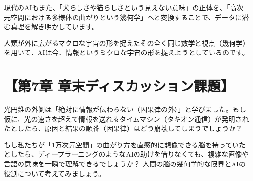 現代のAIもまた、「犬らしさや猫らしさという見えない意味」の正体を、「高次元空間における多様体の曲がりという幾何学」へと変換することで、データに潜む真理を解き明かしています。

人類が外に広がるマクロな宇宙の形を捉えたその全く同じ数学と視点（幾何学）を用いて、AIは今、情報というミクロな宇宙の形を捉えようとしているのです。

\section*{【第7章 章末ディスカッション課題】}

光円錐の外側は「絶対に情報が伝わらない（因果律の外）」と学びました。もし仮に、光の速さを超えて情報を送れるタイムマシン（タキオン通信）が発明されたとしたら、原因と結果の順番（因果律）はどう崩壊してしまうでしょうか？

もし私たちが「1万次元空間」の曲がり方を直感的に想像できる脳を持っていたとしたら、ディープラーニングのようなAIの助けを借りなくても、複雑な画像や言語の意味を一瞬で理解できるでしょうか？ 人間の脳の幾何学的な限界とAIの役割について考えてみましょう。




